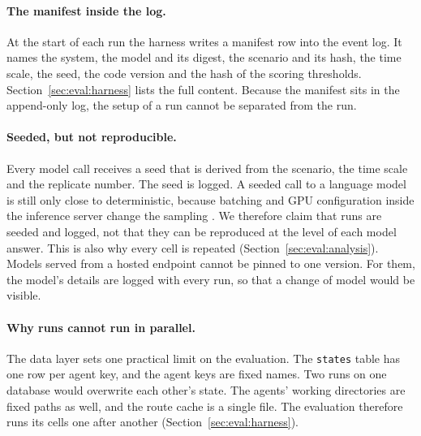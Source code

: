 \paragraph{The manifest inside the log.} At the start of each run the harness
writes a manifest row into the event log. It names the system, the model and
its digest, the scenario and its hash, the time scale, the seed, the code
version and the hash of the scoring thresholds. Section~\ref{sec:eval:harness}
lists the full content. Because the manifest sits in the append-only log,
the setup of a run cannot be separated from the run.

\paragraph{Seeded, but not reproducible.} Every model call receives a seed that
is derived from the scenario, the time scale and the replicate number. The seed
is logged. A seeded call to a language model is still only close to
deterministic, because batching and GPU configuration inside the inference server
change the sampling \parencite{yuan2025}. We therefore claim that runs are seeded and logged, not
that they can be reproduced at the level of each model answer. This is also why
every cell is repeated (Section~\ref{sec:eval:analysis}). Models served from a
hosted endpoint cannot be pinned to one version. For them, the model's details
are logged with every run, so that a change of model would be visible.

\paragraph{Why runs cannot run in parallel.} The data layer sets one practical
limit on the evaluation. The \texttt{states} table has one row per agent key,
and the agent keys are fixed names. Two runs on one database would overwrite
each other's state. The agents' working directories are fixed paths as well,
and the route cache is a single file. The evaluation therefore runs its cells
one after another (Section~\ref{sec:eval:harness}).
